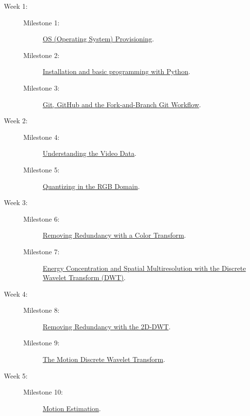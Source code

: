 \begin{description}
\item [Week 1:]
  \begin{description}
  \item [Milestone 1:] \href{https://sistemas-multimedia.github.io/study_guide/01-provisioning/}{OS (Operating System) Provisioning}.
  \item [Milestone 2:] \href{https://sistemas-multimedia.github.io/study_guide/02-python/}{Installation and basic programming with Python}.
  \item [Milestone 3:] \href{https://sistemas-multimedia.github.io/study_guide/03-git/}{Git, GitHub and the Fork-and-Branch Git Workflow}.
  \end{description}
\item [Week 2:]
  \begin{description}
  \item [Milestone 4:] \href{https://sistemas-multimedia.github.io/study_guide/04-the_data/}{Understanding the Video Data}.
  \item [Milestone 5:] \href{https://sistemas-multimedia.github.io/study_guide/05-quantization/}{Quantizing in the RGB Domain}.
  \end{description}
\item [Week 3:]
  \begin{description}
  \item [Milestone 6:] \href{https://sistemas-multimedia.github.io/study_guide/06-color_transform/}{Removing Redundancy with a Color Transform}.
  \item [Milestone 7:] \href{https://sistemas-multimedia.github.io/study_guide/07-DWT/}{Energy Concentration and Spatial Multiresolution with the Discrete Wavelet Transform (DWT)}.
  \end{description}
\item [Week 4:]
  \begin{description}
  \item [Milestone 8:] \href{https://sistemas-multimedia.github.io/study_guide/08-2D-DWT/}{Removing Redundancy with the 2D-DWT}.
  \item [Milestone 9:] \href{https://sistemas-multimedia.github.io/study_guide/09-MDWT/}{The Motion Discrete Wavelet Transform}.
  \end{description}
\item [Week 5:]
  \begin{description}
  \item [Milestone 10:] \href{https://sistemas-multimedia.github.io/study_guide/10-ME/}{Motion Estimation}.

\end{description}
\end{description}
